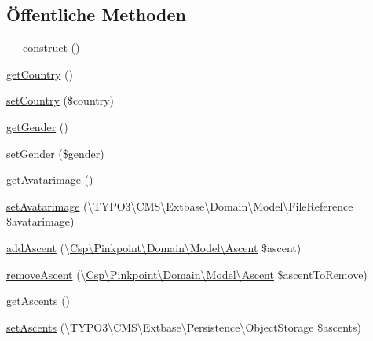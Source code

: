 \subsection*{Öffentliche Methoden}
\begin{DoxyCompactItemize}
\item 
\hyperlink{classCsp_1_1Pinkpoint_1_1Domain_1_1Model_1_1Climber_a25a8b46989febb6bbcd3cf864276831c}{\+\_\+\+\_\+construct} ()
\item 
\hyperlink{classCsp_1_1Pinkpoint_1_1Domain_1_1Model_1_1Climber_aa87e30f87510bed9ebf121daa22df898}{get\+Country} ()
\item 
\hyperlink{classCsp_1_1Pinkpoint_1_1Domain_1_1Model_1_1Climber_ad0c6cf5f03f04dbe4e4debb8099f7053}{set\+Country} (\$country)
\item 
\hyperlink{classCsp_1_1Pinkpoint_1_1Domain_1_1Model_1_1Climber_ad0c96d31ca542fcb88475a436920596a}{get\+Gender} ()
\item 
\hyperlink{classCsp_1_1Pinkpoint_1_1Domain_1_1Model_1_1Climber_a0a9d3b7fe2799d35d7027d568de56b73}{set\+Gender} (\$gender)
\item 
\hyperlink{classCsp_1_1Pinkpoint_1_1Domain_1_1Model_1_1Climber_aa2e75d7d0ad450b3d6da55201e3b7f42}{get\+Avatarimage} ()
\item 
\hyperlink{classCsp_1_1Pinkpoint_1_1Domain_1_1Model_1_1Climber_ac1a3fdeafe0a7fd8a3f6efafc93e5701}{set\+Avatarimage} (\textbackslash{}T\+Y\+P\+O3\textbackslash{}\+C\+M\+S\textbackslash{}\+Extbase\textbackslash{}\+Domain\textbackslash{}\+Model\textbackslash{}\+File\+Reference \$avatarimage)
\item 
\hyperlink{classCsp_1_1Pinkpoint_1_1Domain_1_1Model_1_1Climber_a3892f122900b0e4a8e00b70b6c0a1b34}{add\+Ascent} (\textbackslash{}\hyperlink{classCsp_1_1Pinkpoint_1_1Domain_1_1Model_1_1Ascent}{Csp\textbackslash{}\+Pinkpoint\textbackslash{}\+Domain\textbackslash{}\+Model\textbackslash{}\+Ascent} \$ascent)
\item 
\hyperlink{classCsp_1_1Pinkpoint_1_1Domain_1_1Model_1_1Climber_a63744f07efb5ed76b2614d9ebf6659e7}{remove\+Ascent} (\textbackslash{}\hyperlink{classCsp_1_1Pinkpoint_1_1Domain_1_1Model_1_1Ascent}{Csp\textbackslash{}\+Pinkpoint\textbackslash{}\+Domain\textbackslash{}\+Model\textbackslash{}\+Ascent} \$ascent\+To\+Remove)
\item 
\hyperlink{classCsp_1_1Pinkpoint_1_1Domain_1_1Model_1_1Climber_adb5b39702f586614e70f19ba13e2760f}{get\+Ascents} ()
\item 
\hyperlink{classCsp_1_1Pinkpoint_1_1Domain_1_1Model_1_1Climber_a9f1d0f75c3e8cebcb3943cd8f5d61766}{set\+Ascents} (\textbackslash{}T\+Y\+P\+O3\textbackslash{}\+C\+M\+S\textbackslash{}\+Extbase\textbackslash{}\+Persistence\textbackslash{}\+Object\+Storage \$ascents)

\end{DoxyCompactItemize}
